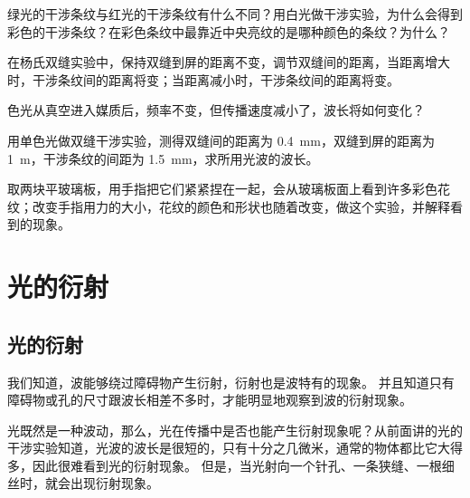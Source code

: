 \begin{Practice}
\begin{question}
  \item 绿光的干涉条纹与红光的干涉条纹有什么不同？用白光做干涉实验，为什么会得到彩色的干涉条纹？在彩色条纹中最靠近中央亮纹的是哪种颜色的条纹？为什么？
  \item 在杨氏双缝实验中，保持双缝到屏的距离不变，调节双缝间的距离，当距离增大时，干涉条纹间的距离将变\underline{\qquad}；当距离减小时，干涉条纹间的距离将变\underline{\qquad}。
  \item 色光从真空进入媒质后，频率不变，但传播速度减小了，波长将如何变化？
  \item 用单色光做双缝干涉实验，测得双缝间的距离为 \qty{0.4}{mm}，双缝到屏的距离为 \qty{1}{m}，干涉条纹的间距为 \qty{1.5}{mm}，求所用光波的波长。
  \item 取两块平玻璃板，用手指把它们紧紧捏在一起，会从玻璃板面上看到许多彩色花纹；改变手指用力的大小，花纹的颜色和形状也随着改变，做这个实验，并解释看到的现象。
\end{question}
\end{Practice}

\section{光的衍射}
\subsection{光的衍射}
我们知道，波能够绕过障碍物产生衍射，衍射也是波特有的现象。
并且知道只有障碍物或孔的尺寸跟波长相差不多时，才能明显地观察到波的衍射现象。

光既然是一种波动，那么，光在传播中是否也能产生衍射现象呢？从前面讲的光的干涉实验知道，光波的波长是很短的，只有十分之几微米，通常的物体都比它大得多，因此很难看到光的衍射现象。
但是，当光射向一个针孔、一条狭缝、一根细丝时，就会出现衍射现象。

